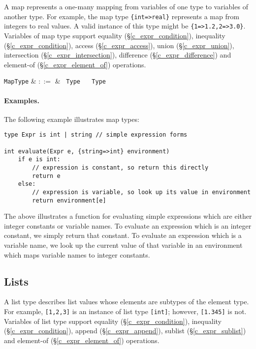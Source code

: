 A map represents a one-many mapping from variables of one type to variables of another type. For example, the map type \lstinline|{int=>real}| represents a map from integers to real values. A valid instance of this type might be \lstinline|{1=>1.2,2=>3.0}|.  Variables of map type support equality (\S\ref{c_expr_condition}), inequality (\S\ref{c_expr_condition}), access (\S\ref{c_expr_access}), union (\S\ref{c_expr_union}), intersection (\S\ref{c_expr_intersection}), difference (\S\ref{c_expr_difference}) and element-of (\S\ref{c_expr_element_of}) operations.

\begin{syntax}
  \verb+MapType+ & $::=$ & \token{\{} \ \verb+Type+ \ \token{=>} \ \verb+Type+ \ \token{\}} \\
\end{syntax}

\paragraph{Examples.}  The following example illustrates map types:

\begin{lstlisting}
type Expr is int | string // simple expression forms

int evaluate(Expr e, {string=>int} environment)
    if e is int:
        // expression is constant, so return this directly
        return e
    else:
        // expression is variable, so look up its value in environment
        return environment[e]
\end{lstlisting}

The above illustrates a function for evaluating simple expressions which are either integer constants or variable names.  To evaluate an expression which is an integer constant, we simply return that constant.  To evaluate an expression which is a variable name, we look up the current value of that variable in an environment which maps variable names to integer constants.


\subsection{Lists}
\label{c_types_list}

A list type describes list values whose elements are subtypes of the element type. For example, \lstinline{[1,2,3]} is an instance of list type \lstinline{[int]}; however, \lstinline{[1.345]} is not.  Variables of list type support equality (\S\ref{c_expr_condition}), inequality (\S\ref{c_expr_condition}), append (\S\ref{c_expr_append}), sublist (\S\ref{c_expr_sublist}) and element-of (\S\ref{c_expr_element_of}) operations.

